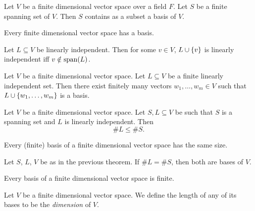 \documentclass[12pt]{article}
\begin{document}
\begin{cor}[] \label{cor:}
    Let $V$ be a finite dimensional vector space over a field $F$.
    Let $S$ be a finite spanning set of $V$.
    Then $S$ contains as a subset a basis of $V$.
\end{cor}

\begin{cor}[] \label{cor:}
    Every finite dimensional vector space has a basis.
\end{cor}

\begin{prop}[] \label{prop:}
    Let $L \subseteq V$ be linearly independent.
    Then for some $v \in V$, $L \cup \set{v}$ is linearly independent iff $v \notin \operatorname{span}(L)$.
\end{prop}

\begin{cor}[] \label{cor:}
    Let $V$ be a finite dimensional vector space.
    Let $L \subseteq V$ be a finite linearly independent set.
    Then there exist finitely many vectors $w_{1}, \dots, w_{m} \in V$ such that $L \cup \set{w_{1}, \dots, w_{m}}$ is a basis.
\end{cor}

\begin{thm}[] \label{thm:}
    Let $V$ be a finite dimensional vector space. Let $S, L \subseteq V$ be such that $S$ is a spanning set and $L$ is linearly independent. Then \[
        \#L \leq \#S.
    \]
\end{thm}

\begin{cor}[] \label{cor:}
    Every (finite) basis of a finite dimensional vector space has the same size.
\end{cor}

\begin{cor}[] \label{cor:}
    Let $S$, $L$, $V$ be as in the previous theorem.
    If $\#L = \#S$, then both are bases of $V$.
\end{cor}

\begin{cor} \label{cor:finite basis}
    Every basis of a finite dimensional vector space is finite.
\end{cor}

\begin{defn}[Dimension] \label{defn:dimension}
    Let $V$ be a finite dimensional vector space.
    We define the length of any of its bases to be the \emph{dimension} of $V$.
\end{defn}
\end{document}
